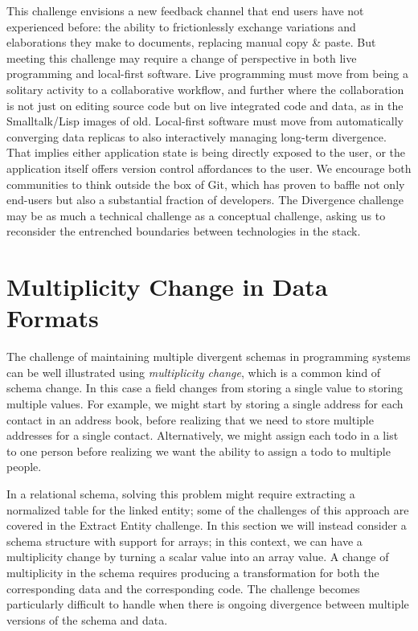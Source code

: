\documentclass[english,crc]{programming}
\begin{document}
This challenge envisions a new feedback channel that end users have not experienced before: the ability to frictionlessly exchange variations and elaborations they make to documents, replacing manual copy \& paste. But meeting this challenge may require a  change of perspective in both live programming and local-first software.
Live programming must move from being a solitary activity to a collaborative workflow, and further where the collaboration is not just on editing source code but on live integrated code and data,
as in the Smalltalk/Lisp images of old.
Local-first software must move from automatically converging data replicas
to also interactively managing long-term divergence. That implies either application state
is being directly exposed to the user, or the application itself offers
version control affordances to the user. We encourage both communities to think outside the box of Git,
which has proven to baffle not only end-users but also a substantial fraction of developers. The Divergence challenge may be as much a technical challenge as a conceptual challenge, asking us to reconsider the entrenched boundaries between technologies in the stack.


\section{Multiplicity Change in Data Formats}

The challenge of maintaining multiple divergent schemas in programming systems can
be well illustrated using \emph{multiplicity change}, which is a common kind of schema change.
In this case a field changes from storing
a single value to storing multiple values. For example, we might start by storing a single
address for each contact in an address book, before realizing that we need to store multiple
addresses for a single contact. Alternatively, we might assign each todo in a list to one person before
realizing we want the ability to assign a todo to multiple people.

In a relational schema, solving this problem might require extracting a normalized table for
the linked entity; some of the challenges of this approach are covered in the Extract Entity
challenge. In this section we will instead consider a schema structure with support for arrays;
in this context, we can have a multiplicity change by turning a scalar value into an array value.
%
A change of multiplicity in the schema requires producing a transformation for both the corresponding
data and the corresponding code. The challenge becomes particularly difficult to handle when there
is ongoing divergence between multiple versions of the schema and data.
\end{document}
